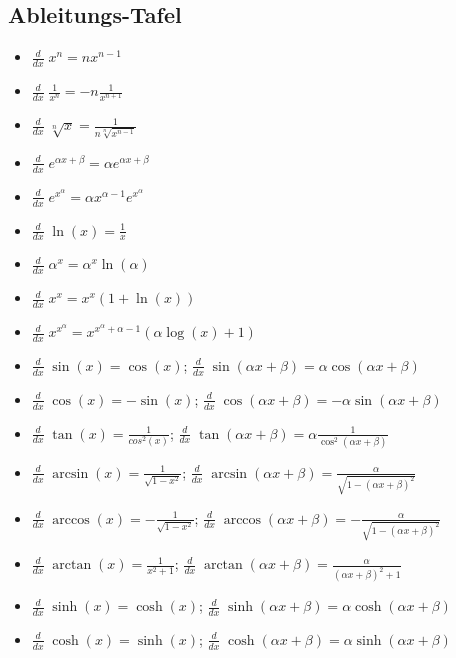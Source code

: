 \subsection{Ableitungs-Tafel}
\begin{itemize}[leftmargin=*]
	\item $\frac{d}{dx}\; x^n = nx^{n-1}$
	\item $\frac{d}{dx}\; \frac{1}{x^n} = -n \frac{1}{x^{n+1}}$
	\item $\frac{d}{dx}\; \sqrt[n]{x} = \frac{1}{n\sqrt[n]{x^{n-1}}}$
	\item $\frac{d}{dx}\; e^{\alpha x + \beta} = \alpha e^{\alpha x + \beta}$
	\item $\frac{d}{dx}\; e^{x^\alpha} = \alpha x^{\alpha - 1} e^{x^\alpha}$
	\item $\frac{d}{dx}\; \ln(x) = \frac{1}{x}$
	\item $\frac{d}{dx}\; \alpha^x = \alpha^x \ln(\alpha)$
	\item $\frac{d}{dx}\; x^x = x^x (1 + \ln(x))$
	\item $\frac{d}{dx}\; x^{x^\alpha} = x^{x^\alpha + \alpha - 1} (\alpha
	\log(x) + 1)$
	\newline
	\item $\frac{d}{dx}\; \sin(x) = \cos(x)$;
	$\frac{d}{dx}\; \sin(\alpha x + \beta) = \alpha \cos(\alpha x +
	\beta)$
	\item $\frac{d}{dx}\; \cos(x) = -\sin(x)$;
	$\frac{d}{dx}\; \cos(\alpha x + \beta) = -\alpha \sin(\alpha x + \beta)$
	\item $\frac{d}{dx}\; \tan(x) = \frac{1}{cos^2(x)}$;
	$\frac{d}{dx}\; \tan(\alpha x + \beta) = \alpha \frac{1}{\cos^2(\alpha x
	+ \beta)}$
	\item $\frac{d}{dx}\; \arcsin(x) = \frac{1}{\sqrt{1-x^2}}$;  
		$\frac{d}{dx}\; \arcsin(\alpha x + \beta) =
	\frac{\alpha}{\sqrt{1-(\alpha x + \beta)^2}}$
	\item $\frac{d}{dx}\; \arccos(x) = -\frac{1}{\sqrt{1-x^2}}$;
		$\frac{d}{dx}\; \arccos(\alpha x + \beta) = -\frac{\alpha}{\sqrt{1 -
	(\alpha x + \beta)^2}}$
	\item $\frac{d}{dx}\; \arctan(x) = \frac{1}{x^2+1}$; 
		$\frac{d}{dx}\; \arctan(\alpha x + \beta) = \frac{\alpha}{(\alpha x +
	\beta)^2 + 1}$
	\newline
	\item $\frac{d}{dx}\; \sinh(x) = \cosh(x)$;
	$\frac{d}{dx}\; \sinh(\alpha x + \beta) = \alpha \cosh(\alpha x + \beta)$
	\item $\frac{d}{dx}\; \cosh(x) = \sinh(x)$;
	$\frac{d}{dx}\; \cosh(\alpha x + \beta) = \alpha \sinh(\alpha x + \beta)$

\end{itemize}
